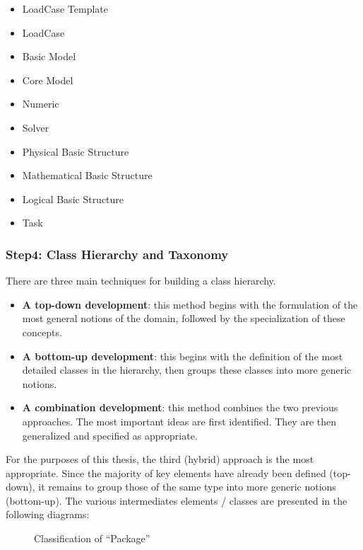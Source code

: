     \begin{itemize}
        \item LoadCase Template
        \item LoadCase
        \item Basic Model
        \item Core Model
        \item Numeric 
        \item Solver
        \item Physical Basic Structure
        \item Mathematical Basic Structure
        \item Logical Basic Structure
        \item Task
    \end{itemize}

    
    \subsubsection{Step4: Class Hierarchy and Taxonomy}
    There are three main techniques for building a class hierarchy.
    \begin{itemize}
        \item \textbf{A top-down development}: this method begins with the formulation of the most general notions of the domain, followed by the specialization of these concepts.
        \item \textbf{A bottom-up development}: this begins with the definition of the most detailed classes in the hierarchy, then groups these classes into more generic notions.
        \item \textbf{A combination development}: this method combines the two previous approaches. The most important ideas are first identified. They are then generalized and specified as appropriate.
    \end{itemize}
    
    For the purposes of this thesis, the third (hybrid) approach is the most appropriate. Since the majority of key elements have already been defined (top-down), it remains to group those of the same type into more generic notions (bottom-up). The various intermediates elements / classes are presented in the following diagrams:
    
    \begin{figure}
        \centering
        \caption{\label{fig:classi-pack} Classification of “Package”}
    \end{figure}
    
